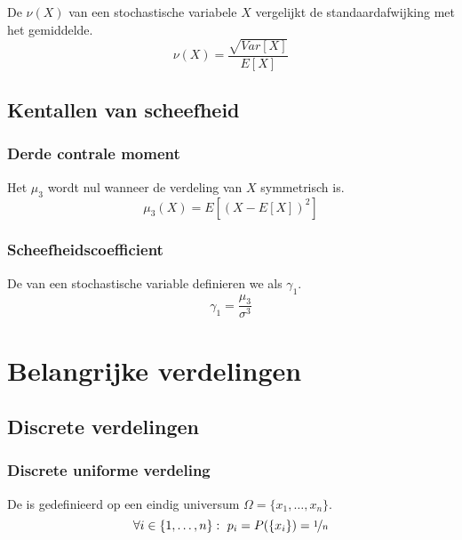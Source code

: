 \documentclass[main.tex]{subfiles}
\begin{document}
\begin{de}
  De  $\nu(X)$ van een stochastische variabele $X$ vergelijkt de standaardafwijking met het gemiddelde.
  \[ \nu(X) = \frac{\sqrt{Var[X]}}{E[X]} \]
\end{de}


\subsection{Kentallen van scheefheid}
\label{sec:kent-van-sche}

\subsubsection{Derde contrale moment}

\begin{de}
  Het  $\mu_{3}$ wordt nul wanneer de verdeling van $X$ symmetrisch is.
  \[ \mu_{3}(X) = E\left[\left(X-E[X]\right)^{2}\right] \]
\end{de}

\subsubsection{Scheefheidscoefficient}

\begin{de}
  De  van een stochastische variable definieren we als $\gamma_{1}$.
  \[ \gamma_{1} = \frac{\mu_{3}}{\sigma^{3}} \]
\end{de}



\section{Belangrijke verdelingen}
\label{sec:belangr-verd}

\subsection{Discrete verdelingen}
\label{sec:discrete-verdelingen}

\subsubsection{Discrete uniforme verdeling}
\label{sec:discr-unif-verd}

\begin{de}
  De  is gedefinieerd op een eindig universum $\Omega=\{x_{1},\dotsc,x_{n}\}$.
  \[ \forall i \in \{1,\dotsc,n\}:\ p_{i} = P(\{x_{i}\}) = \nicefrac{1}{n} \]
\end{de}
\end{document}
